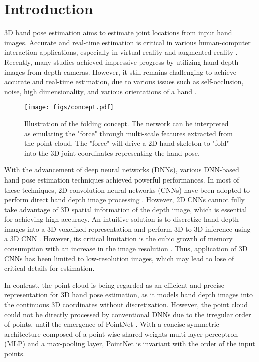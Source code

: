 \documentclass[10pt,twocolumn,letterpaper]{article}
\begin{document}
\section{Introduction}









3D hand pose estimation aims to estimate joint locations from input hand images. 
Accurate and real-time estimation is critical in various human-computer interaction applications, especially in virtual reality and augmented reality \cite{li2019survey, erol2007vision, marchand2015pose}.
Recently, many studies achieved impressive progress by utilizing hand depth images from depth cameras. 
However, it still remains challenging to achieve accurate and real-time estimation, due to various issues such as self-occlusion, noise, high dimensionality, and various orientations of a hand \cite{ge2018point, ge2018hand, moon2018v2v, du2019crossinfonet}.

\begin{figure}
\centering
\texttt{[image: figs/concept.pdf]}
\caption{Illustration of the folding concept. The network can be interpreted as emulating the "force" through multi-scale features extracted from the point cloud. The "force" will drive a 2D hand skeleton to "fold" into the 3D joint coordinates representing the hand pose.}
\label{fig:concept}
\end{figure}

With the advancement of deep neural networks (DNNs), various DNN-based hand pose estimation techniques achieved powerful performances. In most of these techniques, 2D convolution neural networks (CNNs) have been adopted to perform direct hand depth image processing \cite{tompson2014real, ge2016robust,guo2017region, ren2019srn, chen2020pose}.  However, 2D CNNs cannot fully take advantage of 3D spatial information of the depth image, which is essential for achieving high accuracy. An intuitive solution is to discretize hand depth images into a 3D voxelized representation and perform 3D-to-3D inference using a 3D CNN \cite{ge20173d, moon2018v2v}. However, its critical limitation is the cubic growth of memory consumption with an increase in the image resolution \cite{riegler2017octnet}. Thus, application of 3D CNNs has been limited to low-resolution images, which may lead to lose of critical details for estimation.

In contrast, the point cloud is being regarded as an efficient and precise representation for 3D hand pose estimation, as it models hand depth images into the continuous 3D coordinates without discretization. However, the point cloud could not be directly processed by conventional DNNs due to the irregular order of points, until the emergence of PointNet \cite{qi2017pointnet}. With a concise symmetric architecture composed of a point-wise shared-weights multi-layer perceptron (MLP) and a max-pooling layer, PointNet is invariant with the order of the input points. 
\end{document}
